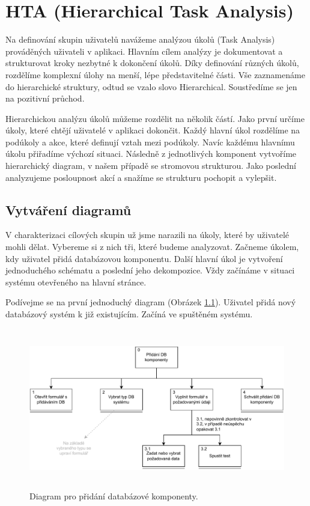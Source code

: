 \chapter{HTA (Hierarchical Task Analysis)}

Na definování skupin uživatelů navážeme analýzou úkolů (Task Analysis) prováděných uživateli v aplikaci. Hlavním cílem analýzy je dokumentovat a strukturovat kroky nezbytné k dokončení úkolů. Díky definování různých úkolů, rozdělíme komplexní úlohy na menší, lépe představitelné části. Vše zaznamenáme do hierarchické struktury, odtud se vzalo slovo Hierarchical. Soustředíme se jen na pozitivní průchod.

Hierarchickou analýzu úkolů můžeme rozdělit na několik částí. Jako první určíme úkoly, které chtějí uživatelé v aplikaci dokončit. Každý hlavní úkol rozdělíme na podúkoly a akce, které definují vztah mezi podúkoly. Navíc každému hlavnímu úkolu přiřadíme výchozí situaci. Následně z jednotlivých komponent vytvoříme hierarchický diagram, v našem případě se stromovou strukturou. Jako poslední analyzujeme posloupnost akcí a snažíme se strukturu pochopit a vylepšit.

\section{Vytváření diagramů}

V charakterizaci cílových skupin už jsme narazili na úkoly, které by uživatelé mohli dělat. Vybereme si z nich tři, které budeme analyzovat. Začneme úkolem, kdy uživatel přidá databázovou komponentu. Další hlavní úkol je vytvoření jednoduchého schématu a poslední jeho dekompozice. Vždy začínáme v situaci systému otevřeného na hlavní stránce.

Podívejme se na první jednoduchý diagram (Obrázek \ref{obr03:hta1}). Uživatel přidá nový databázový systém k již existujícím. Začíná ve spuštěném systému.

\begin{figure}[htb]
  \centering
  \includegraphics[height=70mm]{../img/HTA-1}
  \caption{Diagram pro přidání databázové komponenty.}
  \label{obr03:hta1}
\end{figure}

